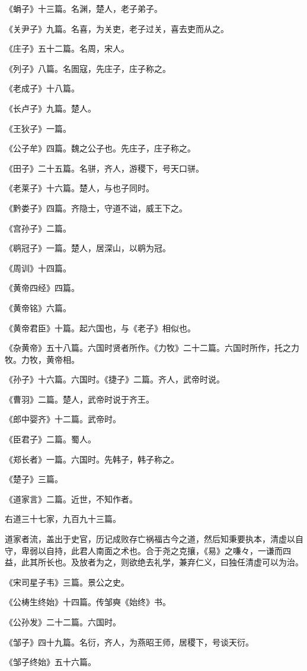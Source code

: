\documentclass[]{article}
\begin{document}
《蜎子》十三篇。名渊，楚人，老子弟子。

《关尹子》九篇。名喜，为关吏，老子过关，喜去吏而从之。

《庄子》五十二篇。名周，宋人。

《列子》八篇。名圄寇，先庄子，庄子称之。

《老成子》十八篇。

《长卢子》九篇。楚人。

《王狄子》一篇。

《公子牟》四篇。魏之公子也。先庄子，庄子称之。

《田子》二十五篇。名骈，齐人，游稷下，号天口骈。

《老莱子》十六篇。楚人，与也子同时。

《黔娄子》四篇。齐隐士，守道不诎，威王下之。

《宫孙子》二篇。

《鹖冠子》一篇。楚人，居深山，以鹖为冠。

《周训》十四篇。

《黄帝四经》四篇。

《黄帝铭》六篇。

《黄帝君臣》十篇。起六国也，与《老子》相似也。

《杂黄帝》五十八篇。六国时贤者所作。《力牧》二十二篇。六国时所作，托之力牧。力牧，黄帝相。

《孙子》十六篇。六国时。《捷子》二篇。齐人，武帝时说。

《曹羽》二篇。楚人，武帝时说于齐王。

《郎中婴齐》十二篇。武帝时。

《臣君子》二篇。蜀人。

《郑长者》一篇。六国时。先韩子，韩子称之。

《楚子》三篇。

《道家言》二篇。近世，不知作者。

右道三十七家，九百九十三篇。

道家者流，盖出于史官，历记成败存亡祸福古今之道，然后知秉要执本，清虚以自守，卑弱以自持，此君人南面之术也。合于尧之克攘，《易》之嗛々，一谦而四益，此其所长也。及放者为之，则欲绝去礼学，兼弃仁义，曰独任清虚可以为治。

《宋司星子韦》三篇。景公之史。

《公梼生终始》十四篇。传邹奭《始终》书。

《公孙发》二十二篇。六国时。

《邹子》四十九篇。名衍，齐人，为燕昭王师，居稷下，号谈天衍。

《邹子终始》五十六篇。
\end{document}
